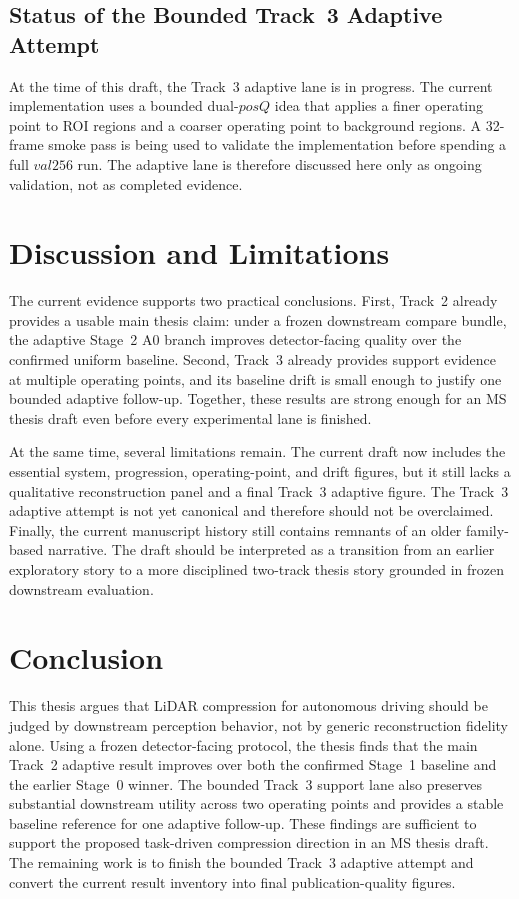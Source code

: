 \subsection{Status of the Bounded Track~3 Adaptive Attempt}
At the time of this draft, the Track~3 adaptive lane is in progress. The current implementation uses a bounded dual-\(posQ\) idea that applies a finer operating point to ROI regions and a coarser operating point to background regions. A 32-frame smoke pass is being used to validate the implementation before spending a full \(val256\) run. The adaptive lane is therefore discussed here only as ongoing validation, not as completed evidence.

\section{Discussion and Limitations}\label{sec:discussion}
The current evidence supports two practical conclusions. First, Track~2 already provides a usable main thesis claim: under a frozen downstream compare bundle, the adaptive Stage~2 A0 branch improves detector-facing quality over the confirmed uniform baseline. Second, Track~3 already provides support evidence at multiple operating points, and its baseline drift is small enough to justify one bounded adaptive follow-up. Together, these results are strong enough for an MS thesis draft even before every experimental lane is finished.

At the same time, several limitations remain. The current draft now includes the essential system, progression, operating-point, and drift figures, but it still lacks a qualitative reconstruction panel and a final Track~3 adaptive figure. The Track~3 adaptive attempt is not yet canonical and therefore should not be overclaimed. Finally, the current manuscript history still contains remnants of an older family-based narrative. The draft should be interpreted as a transition from an earlier exploratory story to a more disciplined two-track thesis story grounded in frozen downstream evaluation.

\section{Conclusion}\label{sec:conclusion}
This thesis argues that LiDAR compression for autonomous driving should be judged by downstream perception behavior, not by generic reconstruction fidelity alone. Using a frozen detector-facing protocol, the thesis finds that the main Track~2 adaptive result improves over both the confirmed Stage~1 baseline and the earlier Stage~0 winner. The bounded Track~3 support lane also preserves substantial downstream utility across two operating points and provides a stable baseline reference for one adaptive follow-up. These findings are sufficient to support the proposed task-driven compression direction in an MS thesis draft. The remaining work is to finish the bounded Track~3 adaptive attempt and convert the current result inventory into final publication-quality figures.
